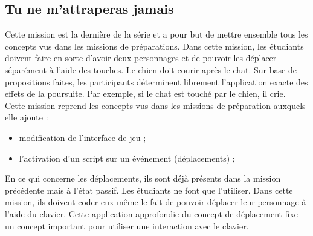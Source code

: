 \subsection{Tu ne m'attraperas jamais}
\label{chien-chat}
Cette mission est la dernière de la série et a pour but de mettre ensemble tous les concepts vus dans les missions de préparations. Dans cette mission, les étudiants doivent faire en sorte d'avoir deux personnages et de pouvoir les déplacer séparément à l'aide des touches. Le chien doit courir après le chat. Sur base de propositions faites, les participants déterminent librement l'application exacte des effets de la poursuite. Par exemple, si le chat est touché par le chien, il crie.\\

Cette mission reprend les concepts vus dans les missions de préparation auxquels elle ajoute :
\begin{itemize}
\item modification de l'interface de jeu ;
\item l'activation d'un \gls{script} sur un événement (déplacements) ;
\end{itemize}

En ce qui concerne les déplacements, ils sont déjà présents dans la mission précédente mais à l'état passif. Les étudiants ne font que l'utiliser. Dans cette mission, ils doivent coder eux-même le fait de pouvoir déplacer leur personnage à l'aide du clavier. Cette application approfondie du concept de déplacement fixe un concept important pour utiliser une interaction avec le clavier.

